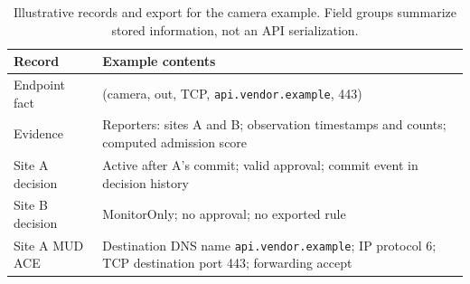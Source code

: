 \documentclass[journal]{IEEEtran}
\theoremstyle{definition}
\begin{document}
\begin{table}[ht]
\centering
\caption{Illustrative records and export for the camera example. Field groups summarize stored information, not an API serialization.}
\label{tab:record-example}
\scriptsize
\begin{tabular}{@{}p{1.5cm}p{5.6cm}@{}}
\toprule
Record & Example contents \\
\midrule
Endpoint fact & (camera, out, TCP, \texttt{api.vendor.example}, 443) \\
Evidence & Reporters: sites A and B; observation timestamps and counts; computed admission score \\
Site A decision & Active after A's commit; valid approval; commit event in decision history \\
Site B decision & MonitorOnly; no approval; no exported rule \\
Site A MUD ACE & Destination DNS name \texttt{api.vendor.example}; IP protocol 6; TCP destination port 443; forwarding accept \\
\bottomrule
\end{tabular}
\end{table}
\end{document}
